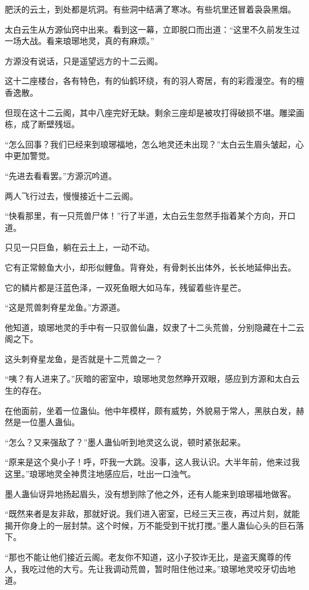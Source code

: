 \begin{this_body}
肥沃的云土，到处都是坑洞。有些洞中结满了寒冰。有些坑里还冒着袅袅黑烟。

太白云生从方源仙窍中出来。看到这一幕，立即脱口而出道：“这里不久前发生过一场大战。看来琅琊地灵，真的有麻烦。”

方源没有说话，只是遥望远方的十二云阁。

这十二座楼台，各有特色，有的仙鹤环绕，有的羽人寄居，有的彩霞漫空。有的檀香逸散。

但现在这十二云阁，其中八座完好无缺。剩余三座却是被攻打得破损不堪。雕梁画栋，成了断壁残垣。

“怎么回事？我们已经来到琅琊福地，怎么地灵还未出现？”太白云生眉头皱起，心中更加警觉。

“先进去看看罢。”方源沉吟道。

两人飞行过去，慢慢接近十二云阁。

“快看那里，有一只荒兽尸体！”行了半道，太白云生忽然手指着某个方向，开口道。

只见一只巨鱼，躺在云土上，一动不动。

它有正常鲸鱼大小，却形似鲤鱼。背脊处，有骨刺长出体外，长长地延伸出去。

它的鳞片都是汪蓝色泽，一双死鱼眼大如马车，残留着些许星芒。

“这是荒兽刺脊星龙鱼。”方源道。

他知道，琅琊地灵的手中有一只驭兽仙蛊，奴隶了十二头荒兽，分别隐藏在十二云阁之下。

这头刺脊星龙鱼，是否就是十二荒兽之一？

“咦？有人进来了。”灰暗的密室中，琅琊地灵忽然睁开双眼，感应到方源和太白云生的存在。

在他面前，坐着一位蛊仙。他中年模样，颇有威势，外貌易于常人，黑肤白发，赫然是一位墨人蛊仙。

“怎么？又来强敌了？”墨人蛊仙听到地灵这么说，顿时紧张起来。

“原来是这个臭小子！呼，吓我一大跳。没事，这人我认识。大半年前，他来过我这里。”琅琊地灵全神贯注地感应后，吐出一口浊气。

墨人蛊仙讶异地扬起眉头，没有想到除了他之外，还有人能来到琅琊福地做客。

“既然来者是友非敌，那就好说。我们进入密室，已经三天三夜，再过片刻，就能揭开你身上的一层封禁。这个时候，万不能受到干扰打搅。”墨人蛊仙心头的巨石落下。

“那也不能让他们接近云阁。老友你不知道，这小子狡诈无比，是盗天魔尊的传人，我吃过他的大亏。先让我调动荒兽，暂时阻住他过来。”琅琊地灵咬牙切齿地道。


\end{this_body}
